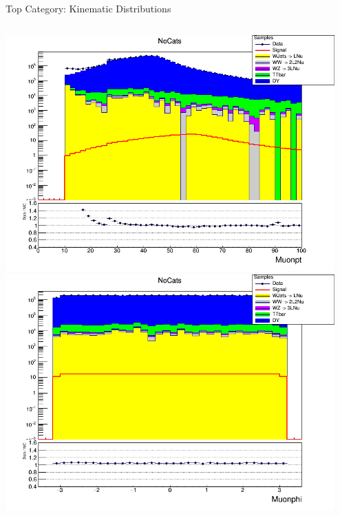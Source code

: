 \documentclass[pdf, 9pt]{beamer}
\begin{document}
  \begin{frame}{Top Category: Kinematic Distributions}
    \begin{columns}[T]
      \begin{column}{0.5\textwidth}
        \includegraphics[width=0.99\textwidth, height=0.45\textheight]{figs/higgs/distributions/baseline_rochester/distribution__NoCats__Muonpt__logY.png}\\
        \includegraphics[width=0.99\textwidth, height=0.45\textheight]{figs/higgs/distributions/baseline_rochester/distribution__NoCats__Muonphi__logY.png}
      \end{column}
      \begin{column}{0.5\textwidth}

\end{column}
\end{columns}
\end{frame}
\end{document}
